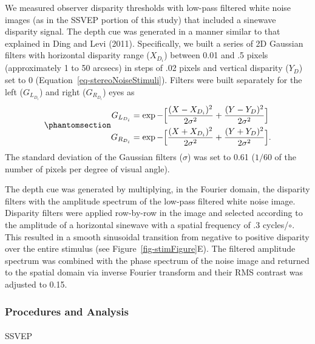 \documentclass[
  12pt,
]{article}
\makeatletter
\let\oldparagraph\paragraph
\renewcommand{\paragraph}{
    \@ifstar
      \xxxParagraphStar
      \xxxParagraphNoStar
  }
\newcommand{\xxxParagraphStar}[1]{\oldparagraph*{#1}\mbox{}}
\newcommand{\xxxParagraphNoStar}[1]{\oldparagraph{#1}\mbox{}}
\makeatother
\begin{document}
We measured observer disparity thresholds with low-pass filtered white
noise images (as in the SSVEP portion of this study) that included a
sinewave disparity signal. The depth cue was generated in a manner
similar to that explained in Ding and Levi (2011). Specifically, we
built a series of 2D Gaussian filters with horizontal disparity range
(\(X_{D_i}\)) between 0.01 and .5 pixels (approximately 1 to 50 arcsecs)
in steps of .02 pixels and vertical disparity (\(Y_D\)) set to 0
(Equation~\ref{eq-stereoNoiseStimuli}). Filters were built separately
for the left (\(G_{L_{D_i}}\)) and right (\(G_{R_{D_i}}\)) eyes as
\begin{equation}\protect\phantomsection\label{eq-stereoNoiseStimuli}{
\begin{aligned}
G_{L_{D_i}} &= \exp-\Big[\frac{(X-X_{D_i})^2}{2\sigma^2}+\frac{(Y-Y_D)^2}{2\sigma^2}\Big] \\
G_{R_{D_i}} &= \exp-\Big[\frac{(X+X_{D_i})^2}{2\sigma^2}+\frac{(Y+Y_D)^2}{2\sigma^2}\Big].
\end{aligned}
}\end{equation} The standard deviation of the Gaussian filters
(\(\sigma\)) was set to 0.61 (\(1/60\) of the number of pixels per
degree of visual angle).

The depth cue was generated by multiplying, in the Fourier domain, the
disparity filters with the amplitude spectrum of the low-pass filtered
white noise image. Disparity filters were applied row-by-row in the
image and selected according to the amplitude of a horizontal sinewave
with a spatial frequency of .3 cycles/\(\circ\). This resulted in a
smooth sinusoidal transition from negative to positive disparity over
the entire stimulus (see Figure~\ref{fig-stimFigure}E). The filtered
amplitude spectrum was combined with the phase spectrum of the noise
image and returned to the spatial domain via inverse Fourier transform
and their RMS contrast was adjusted to 0.15.

\subsubsection{Procedures and Analysis}\label{procedures-and-analysis}

\paragraph{SSVEP}\label{ssvep}
\end{document}
